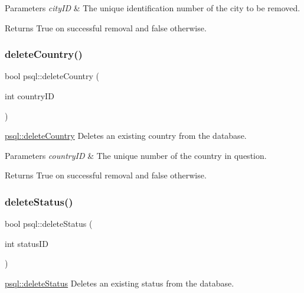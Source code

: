 \begin{DoxyParams}{Parameters}
{\em city\+ID} & The unique identification number of the city to be removed. \\
\hline
\end{DoxyParams}
\begin{DoxyReturn}{Returns}
True on successful removal and false otherwise. 
\end{DoxyReturn}
\mbox{\label{classpsql_a914bf8701fbed4ff80edcd0d09c7c3fd}} 
\subsubsection{\texorpdfstring{delete\+Country()}{deleteCountry()}}
{\footnotesize\ttfamily bool psql\+::delete\+Country (\begin{DoxyParamCaption}\item[{int}]{country\+ID }\end{DoxyParamCaption})}



\hyperlink{classpsql_a914bf8701fbed4ff80edcd0d09c7c3fd}{psql\+::delete\+Country} Deletes an existing country from the database. 


\begin{DoxyParams}{Parameters}
{\em country\+ID} & The unique number of the country in question. \\
\hline
\end{DoxyParams}
\begin{DoxyReturn}{Returns}
True on successful removal and false otherwise. 
\end{DoxyReturn}
\mbox{\label{classpsql_a26fc592cfb9f484e1bee62af527f2b95}} 
\subsubsection{\texorpdfstring{delete\+Status()}{deleteStatus()}}
{\footnotesize\ttfamily bool psql\+::delete\+Status (\begin{DoxyParamCaption}\item[{int}]{status\+ID }\end{DoxyParamCaption})}



\hyperlink{classpsql_a26fc592cfb9f484e1bee62af527f2b95}{psql\+::delete\+Status} Deletes an existing status from the database. 


